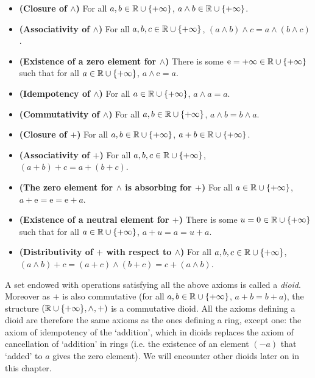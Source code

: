 \begin{itemize}
\item{ \textbf{(Closure of $\wedge$)} For all $a, b  \in \mathbb{R} \cup \{ +\infty \}$,
$a \wedge b \in \mathbb{R} \cup \{ +\infty \}$.}
\item{ \textbf{(Associativity of $\wedge$)} For all $a, b, c \in \mathbb{R} \cup \{ +\infty \}$,
$(a \wedge b) \wedge c =  a \wedge (b \wedge c)$.}
\item{ \textbf{(Existence of a zero element for $\wedge$)}
There is some $\mbox{e} = +\infty \in \mathbb{R} \cup \{ +\infty \}$
such that for all $a \in \mathbb{R} \cup \{ +\infty \}$, $a \wedge
\mbox{e} = a$.}
\item{ \textbf{(Idempotency of $\wedge$)}  For all $a  \in \mathbb{R} \cup \{ +\infty \}$,
$a \wedge a = a$.}
\item{ \textbf{(Commutativity of $\wedge$)} For all $a, b \in \mathbb{R} \cup \{ +\infty \}$,
$a \wedge b = b \wedge a$.}
\item{ \textbf{(Closure of $+$)} For all $a, b  \in \mathbb{R} \cup \{ +\infty \}$,
$a + b \in \mathbb{R} \cup \{ +\infty \}$.}
\item{ \textbf{(Associativity of $+$)} For all $a, b, c \in \mathbb{R} \cup \{ +\infty \}$,
$(a + b) + c =  a + (b + c)$.}
\item{ \textbf{(The zero element for $\wedge$ is absorbing for $+$)}
For all $a \in \mathbb{R} \cup \{ +\infty \}$, $a + \mbox{e} =  \mbox{e} =  \mbox{e}+ a$.}
\item{ \textbf{(Existence of a neutral element for $+$)}
There is some $u = 0 \in \mathbb{R} \cup \{ +\infty \}$ such that for
all $a \in \mathbb{R} \cup \{ +\infty \}$, $a + u = a = u + a$.}
\item{ \textbf{(Distributivity of $+$ with respect to $\wedge$)} For all $a, b, c  \in \mathbb{R} \cup \{ +\infty \}$,
$(a \wedge b) + c =  (a + c) \wedge (b + c) = c + (a \wedge b)$. }
\end{itemize}
A set endowed with operations satisfying all the above axioms is called a {\em dioid}.
Moreover as $+$ is also commutative (for all $a, b \in \mathbb{R} \cup \{ +\infty \}$,
$a + b =  b + a$), the structure $(\mathbb{R} \cup  \{ +\infty \}, \wedge, +)$ is a commutative dioid.
All the axioms defining a dioid are therefore the same axioms as
the ones defining a ring, except one: the axiom of idempotency of
the `addition', which in dioids replaces the axiom of cancellation
of `addition' in rings (i.e. the existence of an element $(-a)$
that `added' to $a$ gives the zero element). We will encounter
other dioids later on in this chapter.
